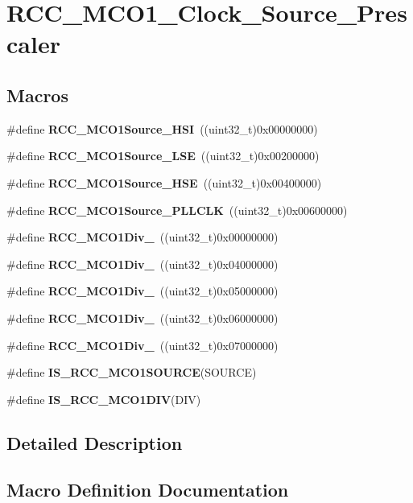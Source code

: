 \section{R\+C\+C\+\_\+\+M\+C\+O1\+\_\+\+Clock\+\_\+\+Source\+\_\+\+Prescaler}
\label{group__RCC__MCO1__Clock__Source__Prescaler}
\subsection*{Macros}
\begin{DoxyCompactItemize}
\item 
\#define \textbf{ R\+C\+C\+\_\+\+M\+C\+O1\+Source\+\_\+\+H\+SI}~((uint32\+\_\+t)0x00000000)
\item 
\#define \textbf{ R\+C\+C\+\_\+\+M\+C\+O1\+Source\+\_\+\+L\+SE}~((uint32\+\_\+t)0x00200000)
\item 
\#define \textbf{ R\+C\+C\+\_\+\+M\+C\+O1\+Source\+\_\+\+H\+SE}~((uint32\+\_\+t)0x00400000)
\item 
\#define \textbf{ R\+C\+C\+\_\+\+M\+C\+O1\+Source\+\_\+\+P\+L\+L\+C\+LK}~((uint32\+\_\+t)0x00600000)
\item 
\#define \textbf{ R\+C\+C\+\_\+\+M\+C\+O1\+Div\+\_}~((uint32\+\_\+t)0x00000000)
\item 
\#define \textbf{ R\+C\+C\+\_\+\+M\+C\+O1\+Div\+\_}~((uint32\+\_\+t)0x04000000)
\item 
\#define \textbf{ R\+C\+C\+\_\+\+M\+C\+O1\+Div\+\_}~((uint32\+\_\+t)0x05000000)
\item 
\#define \textbf{ R\+C\+C\+\_\+\+M\+C\+O1\+Div\+\_}~((uint32\+\_\+t)0x06000000)
\item 
\#define \textbf{ R\+C\+C\+\_\+\+M\+C\+O1\+Div\+\_}~((uint32\+\_\+t)0x07000000)
\item 
\#define \textbf{ I\+S\+\_\+\+R\+C\+C\+\_\+\+M\+C\+O1\+S\+O\+U\+R\+CE}(S\+O\+U\+R\+CE)
\item 
\#define \textbf{ I\+S\+\_\+\+R\+C\+C\+\_\+\+M\+C\+O1\+D\+IV}(D\+IV)
\end{DoxyCompactItemize}


\subsection{Detailed Description}


\subsection{Macro Definition Documentation}
\mbox{\label{group__RCC__MCO1__Clock__Source__Prescaler_ga8a8ff14a7fcdc6ef638ca8666e609c99}} 
